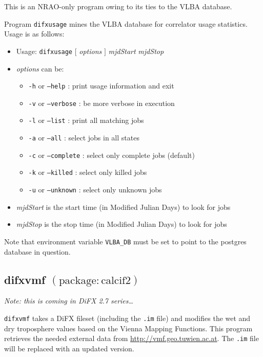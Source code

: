This is an NRAO-only program owing to its ties to the VLBA database.

Program {\tt difxusage} mines the VLBA database for correlator usage statistics.
Usage is as follows:

\begin{itemize}
\item[] Usage: {\tt difxusage} $[$ {\em options} $]$ {\em mjdStart} {\em mjdStop}
\item[] {\em options} can be:
\begin{itemize}
\item[] {\tt -h} or {\tt --help} : print usage information and exit
\item[] {\tt -v} or {\tt --verbose} : be more verbose in execution
\item[] {\tt -l} or {\tt --list} : print all matching jobs
\item[] {\tt -a} or {\tt --all} : select jobs in all states
\item[] {\tt -c} or {\tt --complete} : select only complete jobs (default)
\item[] {\tt -k} or {\tt --killed} : select only killed jobs
\item[] {\tt -u} or {\tt --unknown} : select only unknown jobs
\end{itemize}
\item[] {\em mjdStart} is the start time (in Modified Julian Days) to look for jobs
\item[] {\em mjdStop} is the stop time (in Modified Julian Days) to look for jobs
\end{itemize}

\noindent
Note that environment variable {\tt VLBA\_DB} must be set to point to the postgres database in question.







\subsection{difxvmf {\small $\mathrm{(package: calcif2)}$}} \label{sec:difxvmf}

{\em Note: this is coming in DiFX 2.7 series\ldots}

{\tt difxvmf} takes a DiFX fileset (including the {\tt .im} file) and modifies the wet and dry troposphere values based on the Vienna Mapping Functions.
This program retrieves the needed external data from \url{http://vmf.geo.tuwien.ac.at}. 
The {\tt .im} file will be replaced with an updated version.

